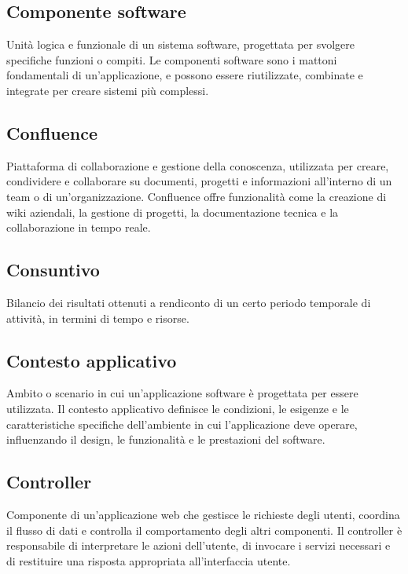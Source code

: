 \hypertarget{sec:componente software}{}
\subsection*{Componente software}
Unità logica e funzionale di un sistema software, progettata per svolgere specifiche funzioni o compiti. Le componenti software sono i mattoni
fondamentali di un'applicazione, e possono essere riutilizzate, combinate e integrate per creare sistemi più complessi.

\hypertarget{sec:confluence}{}
\subsection*{Confluence}
Piattaforma di collaborazione e gestione della conoscenza, utilizzata per creare, condividere e collaborare su documenti, progetti e informazioni all'interno 
di un team o di un'organizzazione. Confluence offre funzionalità come la creazione di wiki aziendali, la gestione di progetti, la documentazione tecnica e la 
collaborazione in tempo reale.

\hypertarget{sec:consuntivo}{}
\subsection*{Consuntivo}
Bilancio dei risultati ottenuti a rendiconto di un certo periodo temporale di attività, in termini di tempo e risorse.

\hypertarget{sec:contesto_applicativo}{}
\subsection*{Contesto applicativo}
Ambito o scenario in cui un'applicazione software è progettata per essere utilizzata. Il contesto applicativo definisce le condizioni, le esigenze e le
caratteristiche specifiche dell'ambiente in cui l'applicazione deve operare, influenzando il design, le funzionalità e le prestazioni del software.

\hypertarget{sec:controller}{}
\subsection*{Controller}
Componente di un'applicazione web che gestisce le richieste degli utenti, coordina il flusso di dati e controlla il comportamento degli altri componenti.
Il controller è responsabile di interpretare le azioni dell'utente, di invocare i servizi necessari e di restituire una risposta appropriata all'interfaccia utente.

